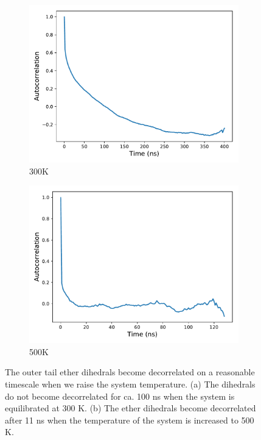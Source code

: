 \documentclass[journal=jpcbfk,manuscript=article]{achemso}
\begin{document}
  \begin{figure}[!htb]
  \centering
  \begin{subfigure}{0.45\textwidth}
  	\centering
  	\includegraphics[width=\textwidth]{dihedral_autocorrelation_300K.pdf}
  	\caption{300K}\label{fig:dihedrals_300K}
  \end{subfigure}
  \begin{subfigure}{0.45\textwidth}
  	\centering
  	\includegraphics[width=\textwidth]{dihedral_autocorrelation_500K.pdf} %
  	\caption{500K}\label{fig:dihedrals_500K}
  \end{subfigure}
  \caption{The outer tail ether dihedrals become decorrelated on a reasonable
  timescale when we raise the system temperature. (a) The dihedrals do not
  become decorrelated for ca. 100 ns when the system is equilibrated at 300 K.
  (b) The ether dihedrals become decorrelated after 11 ns when the temperature
  of the system is increased to 500 K.}\label{fig:dihedrals}
  \end{figure}
  
\end{document}

